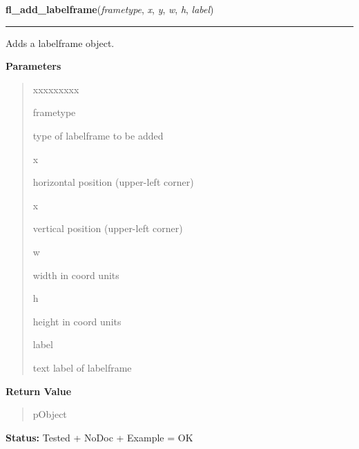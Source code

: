     \label{xformslib:library:fl_add_labelframe}

    \vspace{0.5ex}

\hspace{.8\funcindent}\begin{boxedminipage}{\funcwidth}

    \raggedright \textbf{fl\_add\_labelframe}(\textit{frametype}, \textit{x}, \textit{y}, \textit{w}, \textit{h}, \textit{label})

    \vspace{-1.5ex}

    \rule{\textwidth}{0.5\fboxrule}
\setlength{\parskip}{2ex}
    Adds a labelframe object.

\setlength{\parskip}{1ex}
      \textbf{Parameters}
      \vspace{-1ex}

      \begin{quote}
        \begin{Ventry}{xxxxxxxxx}

          \item[frametype]

          type of labelframe to be added

          \item[x]

          horizontal position (upper-left corner)

          \item[x]

          vertical position (upper-left corner)

          \item[w]

          width in coord units

          \item[h]

          height in coord units

          \item[label]

          text label of labelframe

        \end{Ventry}

      \end{quote}

      \textbf{Return Value}
    \vspace{-1ex}

      \begin{quote}
      pObject

      \end{quote}

\textbf{Status:} Tested + NoDoc + Example = OK



    \end{boxedminipage}

